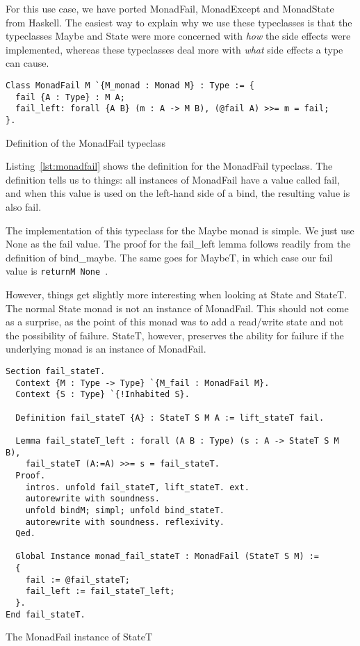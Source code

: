 For this use case, we have ported MonadFail, MonadExcept and MonadState from
Haskell. The easiest way to explain why we use these typeclasses is that 
the typeclasses Maybe and State were more concerned with
\textit{how} the side effects were implemented, whereas these typeclasses deal 
more with \textit{what} side effects a type can cause.

\begin{listing}
\begin{verbatim}
Class MonadFail M `{M_monad : Monad M} : Type := {
  fail {A : Type} : M A;
  fail_left: forall {A B} (m : A -> M B), (@fail A) >>= m = fail;
}.
\end{verbatim}
\caption{Definition of the MonadFail typeclass}
\label{lst:monadfail}
\end{listing}

Listing~\ref{lst:monadfail} shows the definition for the MonadFail typeclass.
The definition tells us to things: all instances of MonadFail have a value
called fail, and when this value is used on the left-hand side of a bind, the
resulting value is also fail.

The implementation of this typeclass for the Maybe monad is simple. We just use
None as the fail value. The proof for the fail\_left lemma follows readily from
the definition of bind\_maybe. The same goes for MaybeT, in which case our fail
value is \texttt{returnM None }.

However, things get slightly more interesting when looking at State and StateT.
The normal State monad is not an instance of MonadFail. This should not come as
a surprise, as the point of this monad was to add a read/write state and not
the possibility of failure. StateT, however, preserves the ability for failure
if the underlying monad is an instance of MonadFail.

\begin{listing}
\begin{verbatim}
Section fail_stateT.
  Context {M : Type -> Type} `{M_fail : MonadFail M}.
  Context {S : Type} `{!Inhabited S}.

  Definition fail_stateT {A} : StateT S M A := lift_stateT fail.

  Lemma fail_stateT_left : forall (A B : Type) (s : A -> StateT S M B),
    fail_stateT (A:=A) >>= s = fail_stateT.
  Proof.
    intros. unfold fail_stateT, lift_stateT. ext. 
    autorewrite with soundness. 
    unfold bindM; simpl; unfold bind_stateT. 
    autorewrite with soundness. reflexivity.
  Qed.

  Global Instance monad_fail_stateT : MonadFail (StateT S M) :=
  {
    fail := @fail_stateT;
    fail_left := fail_stateT_left;
  }.
End fail_stateT.
\end{verbatim}
\caption{The MonadFail instance of StateT}
\label{lst:monadfail_stateT}
\end{listing}

